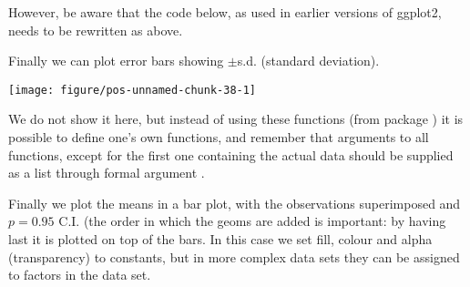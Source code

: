 \documentclass[paper=a4,10pt,div=17,headsepline,BCOR=12mm,twoside,open=right]{scrbook}\usepackage{knitr}
\begin{document}
However, be aware that the code below, as used in earlier versions of ggplot2, needs to be rewritten as above.

\begin{knitrout}\footnotesize
{}\color{fgcolor}\begin{kframe}
\begin{alltt}
 \hlopt{+} \hlstd{(} \hlstd{=} \hlstd{,}  \hlstd{=} \hlstd{,}
                    \hlstd{=}\hlstd{,} \hlstd{=}\hlstd{,} \hlstd{=}\hlstd{)}
\end{alltt}
\end{kframe}
\end{knitrout}

Finally we can plot error bars showing $\pm$s.d. (standard deviation).

\begin{knitrout}\footnotesize
{}\color{fgcolor}\begin{kframe}
\begin{alltt}
 \hlopt{+} \hlstd{(} \hlstd{=} \hlstd{,}
                     \hlstd{=} \hlstd{(} \hlstd{=} \hlstd{),}
                    \hlstd{=}\hlstd{,} \hlstd{=}\hlstd{,} \hlstd{=}\hlstd{)}
\end{alltt}
\end{kframe}

{\centering \texttt{[image: figure/pos-unnamed-chunk-38-1]} 

}



\end{knitrout}

We do not show it here, but instead of using these functions (from package ) it is possible to define one's own functions, and remember that arguments to all functions, except for the first one containing the actual data should be supplied as a list through formal argument .

Finally we plot the means in a bar plot, with the observations superimposed and $p = 0.95$ C.I. (the order in which the geoms are added is important: by having  last it is plotted on top of the bars. In this case we set fill, colour and alpha (transparency) to constants, but in more complex data sets they can be assigned to factors in the data set.
\end{document}
